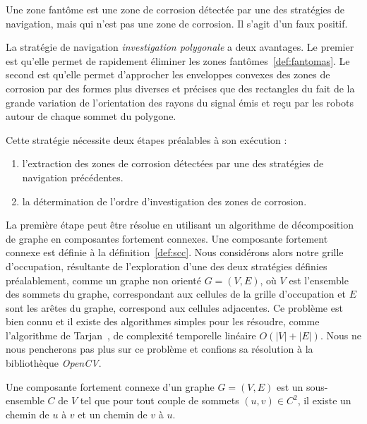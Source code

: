 \documentclass[english,RandD]{rapportPFE}  %
\begin{document}
				\begin{Definition}
					\label{def:fantomas}
					Une zone fantôme est une zone de corrosion détectée par une des stratégies de navigation, mais qui n'est pas une zone de corrosion. Il s'agit d'un faux positif.
				\end{Definition}

				La stratégie de navigation \textit{investigation polygonale} a deux avantages.
				Le premier est qu'elle permet de rapidement éliminer les zones fantômes~\ref{def:fantomas}.
				Le second est qu'elle permet d'approcher les enveloppes convexes des zones de corrosion par des formes plus diverses et précises que des rectangles du fait de la grande variation de l'orientation des rayons du signal émis et reçu par les robots autour de chaque sommet du polygone.

				Cette stratégie nécessite deux étapes préalables à son exécution :
				\begin{enumerate}
					\item l'extraction des zones de corrosion détectées par une des stratégies de navigation précédentes.
					\item la détermination de l'ordre d'investigation des zones de corrosion.
				\end{enumerate}

				La première étape peut être résolue en utilisant un algorithme de décomposition de graphe en composantes fortement connexes.
				Une composante fortement connexe est définie à la définition~\ref{def:scc}.
				Nous considérons alors notre grille d'occupation, résultante de l'exploration d'une des deux stratégies définies préalablement, comme un graphe non orienté $G = (V, E)$, où  $V$ est l'ensemble des sommets du graphe, correspondant aux cellules de la grille d'occupation et $E$ sont les arêtes du graphe, correspond aux cellules adjacentes.
				Ce problème est bien connu et il existe des algorithmes simples pour les résoudre, comme l'algorithme de Tarjan~\cite{enwiki:1148118528}, de complexité temporelle linéaire $O(|V| + |E|)$.
				Nous ne nous pencherons pas plus sur ce problème et confions sa résolution à la bibliothèque \textit{OpenCV}.

				\begin{Definition}
					\label{def:scc}
					Une composante fortement connexe d'un graphe $G = (V, E)$ est un sous-ensemble $C$ de $V$ tel que pour tout couple de sommets $(u, v) \in C^2$, il existe un chemin de $u$ à $v$ et un chemin de $v$ à $u$.
				\end{Definition}
\end{document}
